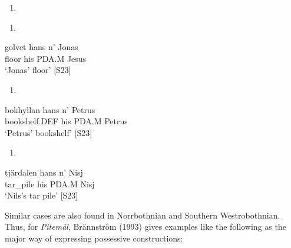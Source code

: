 \begin{enumerate} %
\item 
\end{enumerate} %
\setcounter{listLFOxcviiileveli}{0}
\begin{enumerate} %
\item 
\end{enumerate} %
\ea\label{}
\gll golvet  hans  n’  Jonas\\


floor  his  PDA.M  Jesus\\ %


 ‘Jonas’ floor’ [S23]
\z

\begin{enumerate} %
\item 
\end{enumerate} %
\ea\label{}
\gll bokhyllan  hans  n’  Petrus\\


bookshelf.DEF  his  PDA.M  Petrus\\ %


‘Petrus’ bookshelf’ [S23]
\z

\begin{enumerate} %
\item 
\end{enumerate} %
\ea\label{}
\gll tjärdalen  hans  n’  Nisj\\


tar\_pile  his  PDA.M  Nisj\\ %


‘Nils’s tar pile’ [S23]
\z

Similar cases are also found in Norrbothnian and Southern Westrobothnian. Thus, for \textit{Pitemål}, Brännström (1993) gives examples like the following as the major way of expressing possessive constructions:

